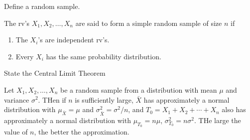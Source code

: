 \begin{questions}
    \question[1] Define a random sample.
    \begin{solution}
        The rv's $X_1, X_2, \ldots, X_n$ are said to form a simple
    random sample of size $n$ if
    \begin{enumerate}
    \item The $X_i$'s are independent rv's. 
    \item Every $X_i$ has the same probability distribution.
    \end{enumerate}
    \end{solution}


    \question[1] State the Central Limit Theorem
    \begin{solution}
        Let $X_1, X_2, \ldots, X_n$ be a random sample from a
    distribution with mean $\mu$ and variance $\sigma^2$. THen if $n$
    is sufficiently large, $\bar{X}$ has approximately a normal
    distribution with $\mu_{\bar{X}} = \mu$ and $\sigma_{\bar{X}}^2
    = \sigma^2/n$, and $T_0 = X_1 + X_2 + \cdots + X_n$ also has
    approximately a normal distribution with $\mu_{T_0} = n\mu$,
    $\sigma_{T_0}^2 = n\sigma^2$. THe large the value of $n$, the
    better the approximation.
    \end{solution}

\end{questions}

